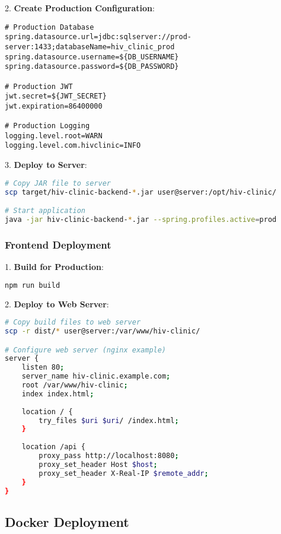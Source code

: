 \documentclass[12pt,a4paper]{article}
\begin{document}
2. \textbf{Create Production Configuration}:
\begin{lstlisting}[language=properties, caption=Production Properties]
# Production Database
spring.datasource.url=jdbc:sqlserver://prod-server:1433;databaseName=hiv_clinic_prod
spring.datasource.username=${DB_USERNAME}
spring.datasource.password=${DB_PASSWORD}

# Production JWT
jwt.secret=${JWT_SECRET}
jwt.expiration=86400000

# Production Logging
logging.level.root=WARN
logging.level.com.hivclinic=INFO
\end{lstlisting}

3. \textbf{Deploy to Server}:
\begin{lstlisting}[language=bash, caption=Deployment]
# Copy JAR file to server
scp target/hiv-clinic-backend-*.jar user@server:/opt/hiv-clinic/

# Start application
java -jar hiv-clinic-backend-*.jar --spring.profiles.active=prod
\end{lstlisting}

\subsubsection{Frontend Deployment}

1. \textbf{Build for Production}:
\begin{lstlisting}[language=bash, caption=Frontend Build]
npm run build
\end{lstlisting}

2. \textbf{Deploy to Web Server}:
\begin{lstlisting}[language=bash, caption=Frontend Deployment]
# Copy build files to web server
scp -r dist/* user@server:/var/www/hiv-clinic/

# Configure web server (nginx example)
server {
    listen 80;
    server_name hiv-clinic.example.com;
    root /var/www/hiv-clinic;
    index index.html;
    
    location / {
        try_files $uri $uri/ /index.html;
    }
    
    location /api {
        proxy_pass http://localhost:8080;
        proxy_set_header Host $host;
        proxy_set_header X-Real-IP $remote_addr;
    }
}
\end{lstlisting}

\subsection{Docker Deployment}
\end{document}
